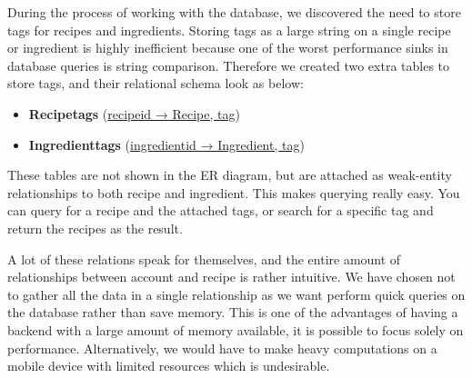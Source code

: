 During the process of working with the database, we discovered the need to store tags for recipes and ingredients. Storing tags as a large string on a single recipe or ingredient is highly inefficient because one of the worst performance sinks in database queries is string comparison. Therefore we created two extra tables to store tags, and their relational schema look as below:

\begin{itemize}
\item \textbf{Recipetags} (\underline{recipeid → Recipe, tag})

\item \textbf{Ingredienttags} (\underline{ingredientid → Ingredient, tag}) 
\end{itemize}

These tables are not shown in the ER diagram, but are attached as weak-entity relationships to both recipe and ingredient. This makes querying really easy. You can query for a recipe and the attached tags, or search for a specific tag and return the recipes as the result.

A lot of these relations speak for themselves, and the entire amount of relationships between account and recipe is rather intuitive. We have chosen not to gather all the data in a single relationship as we want perform quick queries on the database rather than save memory. This is one of the advantages of having a backend with a large amount of memory available, it is possible to focus solely on performance. Alternatively, we would have to make heavy computations on a mobile device with limited resources which is undesirable.